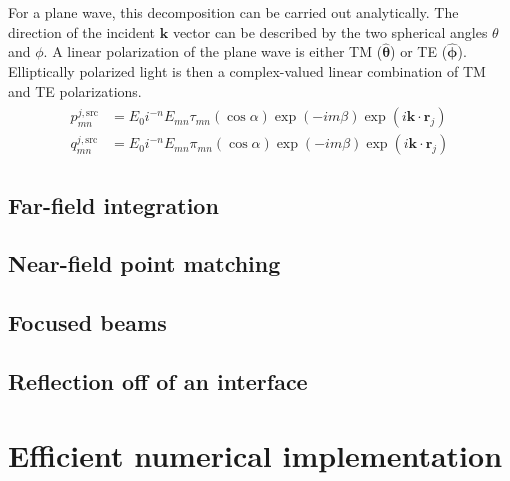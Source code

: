 \documentclass[11pt]{article}
\begin{document}
For a plane wave, this decomposition can be carried out analytically.
The direction of the incident $\bm{k}$ vector can be described by the two spherical angles $\theta$ and $\phi$.
A linear polarization of the plane wave is either TM ($\bm{\hat \theta}$) or TE ($\bm{\hat \phi}$).
Elliptically polarized light is then a complex-valued linear combination of TM and TE polarizations.
\begin{align}
\begin{split}
p_{mn}^{j,\text{src}} &= E_0 i^{-n} E_{mn} \tau_{mn}(\cos \alpha) \exp(-im\beta) \exp(i\bm{k} \cdot \bm{r}_j) \\
q_{mn}^{j,\text{src}} &= E_0 i^{-n} E_{mn} \pi_{mn}(\cos \alpha) \exp(-im\beta) \exp(i\bm{k} \cdot \bm{r}_j)
\end{split}
\end{align}


\subsection{Far-field integration}
\subsection{Near-field point matching}
\subsection{Focused beams}

\subsection{Reflection off of an interface}

\section{Efficient numerical implementation}
\end{document}
